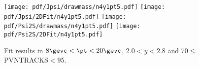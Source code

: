 \begin{figure}[H]
\begin{center}
\texttt{[image: pdf/Jpsi/drawmass/n4y1pt5.pdf]}
\texttt{[image: pdf/Jpsi/2DFit/n4y1pt5.pdf]}
\vspace*{-0.5cm}
\texttt{[image: pdf/Psi2S/drawmass/n4y1pt5.pdf]}
\texttt{[image: pdf/Psi2S/2DFit/n4y1pt5.pdf]}
\vspace*{-0.5cm}
\end{center}
\caption{Fit results in $8\gevc<\pt<20\gevc$, $2.0<y<2.8$ and 70$\leq$PVNTRACKS$<$95.}
\label{Fitn4y1pt5}
\end{figure}
